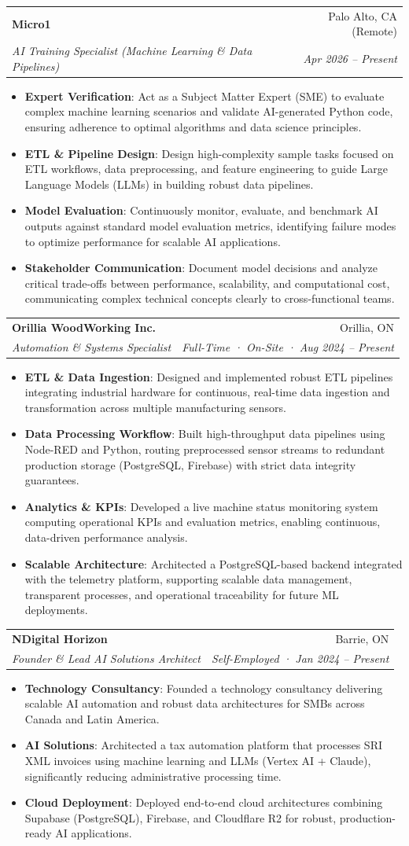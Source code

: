 \documentclass[letterpaper,11pt]{article}
\makeatletter
\newcommand{\resumeItem}[2]{
  \item\small{
    \textbf{#1}{: #2 \vspace{-2pt}}
  }
}
\newcommand{\resumeSubheading}[4]{
  \vspace{-1pt}\item
    \begin{tabular*}{0.97\textwidth}{l@{\extracolsep{\fill}}r}
      \textbf{#1} & #2 \\
      \textit{\small#3} & \textit{\small #4} \\
    \end{tabular*}\vspace{-5pt}
}
\newcommand{\resumeItemListStart}{\begin{itemize}}
\newcommand{\resumeItemListEnd}{\end{itemize}\vspace{-5pt}}
\makeatother
\begin{document}
\resumeSubheading
    {Micro1}{Palo Alto, CA (Remote)}
    {AI Training Specialist (Machine Learning \& Data Pipelines)}{Apr 2026 -- Present}
  \resumeItemListStart
    \resumeItem{Expert Verification}
      {Act as a Subject Matter Expert (SME) to evaluate complex machine learning scenarios and validate AI-generated Python code, ensuring adherence to optimal algorithms and data science principles.}
    \resumeItem{ETL \& Pipeline Design}
      {Design high-complexity sample tasks focused on ETL workflows, data preprocessing, and feature engineering to guide Large Language Models (LLMs) in building robust data pipelines.}
    \resumeItem{Model Evaluation}
      {Continuously monitor, evaluate, and benchmark AI outputs against standard model evaluation metrics, identifying failure modes to optimize performance for scalable AI applications.}
    \resumeItem{Stakeholder Communication}
      {Document model decisions and analyze critical trade-offs between performance, scalability, and computational cost, communicating complex technical concepts clearly to cross-functional teams.}
  \resumeItemListEnd

\resumeSubheading
  {Orillia WoodWorking Inc.}{Orillia, ON}
  {Automation \& Systems Specialist}{Full-Time · On-Site · Aug 2024 -- Present}
\resumeItemListStart
  \resumeItem{ETL \& Data Ingestion}
    {Designed and implemented robust ETL pipelines integrating industrial hardware for continuous, real-time data ingestion and transformation across multiple manufacturing sensors.}
  \resumeItem{Data Processing Workflow}
    {Built high-throughput data pipelines using Node-RED and Python, routing preprocessed sensor streams to redundant production storage (PostgreSQL, Firebase) with strict data integrity guarantees.}
  \resumeItem{Analytics \& KPIs}
    {Developed a live machine status monitoring system computing operational KPIs and evaluation metrics, enabling continuous, data-driven performance analysis.}
  \resumeItem{Scalable Architecture}
    {Architected a PostgreSQL-based backend integrated with the telemetry platform, supporting scalable data management, transparent processes, and operational traceability for future ML deployments.}
\resumeItemListEnd

  \resumeSubheading
    {NDigital Horizon}{Barrie, ON}
    {Founder \& Lead AI Solutions Architect}{Self-Employed · Jan 2024 -- Present}
  \resumeItemListStart
    \resumeItem{Technology Consultancy}
      {Founded a technology consultancy delivering scalable AI automation and robust data architectures for SMBs across Canada and Latin America.}
    \resumeItem{AI Solutions}
      {Architected a tax automation platform that processes SRI XML invoices using machine learning and LLMs (Vertex AI + Claude), significantly reducing administrative processing time.}
    \resumeItem{Cloud Deployment}
      {Deployed end-to-end cloud architectures combining Supabase (PostgreSQL), Firebase, and Cloudflare R2 for robust, production-ready AI applications.}
  \resumeItemListEnd
\end{document}
